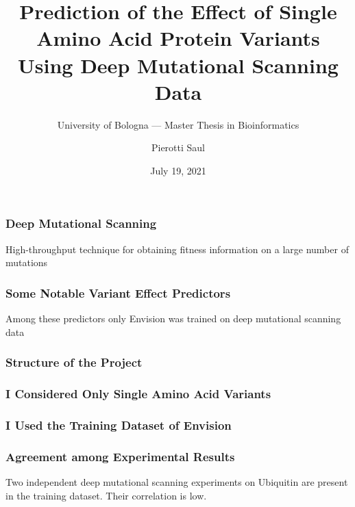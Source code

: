 \documentclass[10pt, british, luatex]{beamer}
\title[Single Amino Acid Variants Prediction]{Prediction of the Effect of Single Amino Acid Protein
	Variants\\Using Deep Mutational Scanning Data}
\subtitle[]{University of Bologna --- Master Thesis in Bioinformatics}
\author[Pierotti Saul]{Pierotti Saul}
\date{July 19, 2021}
\begin{document}
\begin{frame}[plain]
	\titlepage%
\end{frame}

\begin{frame}
	\frametitle{Deep Mutational Scanning}
	High-throughput technique for obtaining fitness information on a large number of mutations
	\vfill%
	\begin{figure}
		
	\end{figure}
\end{frame}

\begin{frame}
	\frametitle{Some Notable Variant Effect Predictors}
	\begin{figure}
		
	\end{figure}
	\vfill%
	Among these predictors only Envision was trained on deep mutational scanning data
\end{frame}



\begin{frame}
	\frametitle{Structure of the Project}
	\begin{figure}
		
	\end{figure}
\end{frame}

\begin{frame}
	\frametitle{I Considered Only Single Amino Acid Variants}
	\vfill%
	\begin{figure}
		
	\end{figure}
\end{frame}

\begin{frame}
	\frametitle{I Used the Training Dataset of Envision {\small\parencite{Gray2018}}}
	\vfill%
	\centering%
	{%
		\let\bfseries\sbseries%
		
		
	}
\end{frame}

\begin{frame}
	\frametitle{Agreement among Experimental Results}
	Two independent deep mutational scanning experiments on Ubiquitin are present in the training dataset.
	Their correlation is low.
	\vfill%
	\centering%
	{%
		\let\bfseries\sbseries%
		
	}
\end{frame}
\end{document}
